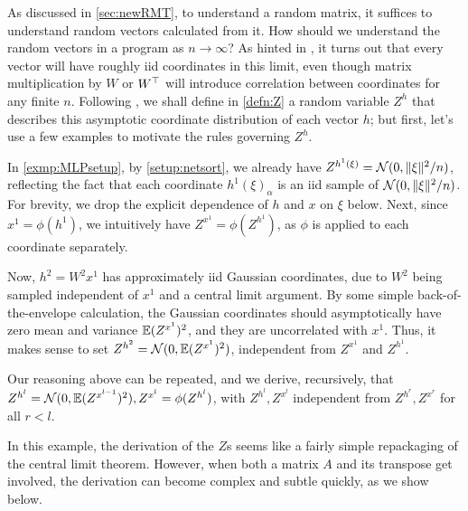 \documentclass[main.tex]{subfiles}
\begin{document}
As discussed in \cref{sec:newRMT}, to understand a random matrix, it suffices to understand random vectors calculated from it.
How should we understand the random vectors in a \netsort{} program as $n\to\infty$? As hinted in \citet{yangTP1,yangTP2}, it turns out that every vector will have roughly iid coordinates in this limit, even though matrix multiplication by $W$ or $W^{\top}$ will introduce correlation between coordinates for any finite $n$.
Following \citet{yangTP2}, we shall define in \cref{defn:Z} a random variable $Z^h$ that describes this asymptotic coordinate distribution of each vector $h$; but first, let's use a few examples to motivate the rules governing $Z^h$.

\begin{exmp}\label{exmp:MLPZs}
In \cref{exmp:MLPsetup}, by \cref{setup:netsort}, we already have $Z^{h^1(\xi)} = \mathcal{N}(0, \|\xi\|^2/n)$, reflecting the fact that each coordinate $h^1(\xi)_\alpha$ is an iid sample of $\mathcal{N}(0, \|\xi\|^2/n)$.
For brevity, we drop the explicit dependence of $h$ and $x$ on $\xi$ below.
Next, since ${x^1} = {\phi(h^1)}$, we intuitively have $Z^{x^1} = \phi(Z^{h^1})$, as $\phi$ is applied to each coordinate separately.

Now, ${h^2} = W^2 x^1$ has approximately iid Gaussian coordinates, due to $W^2$ being sampled independent of $x^1$ and a central limit argument.
By some simple back-of-the-envelope calculation, the Gaussian coordinates should asymptotically have zero mean and variance $\operatorname*{\mathbb{E}}(Z^{x^1})^2$, and they are uncorrelated with $x^1$.
Thus, it makes sense to set $Z^{h^2} = \mathcal{N}(0, \operatorname*{\mathbb{E}}(Z^{x^1})^2)$, independent from $Z^{x^1}$ and $Z^{h^1}$.

Our reasoning above can be repeated, and we derive, recursively, that $Z^{h^l} =  \mathcal{N}(0, \operatorname*{\mathbb{E}} (Z^{x^{l-1}})^2), Z^{x^l} = \phi(Z^{h^l})$, with $Z^{h^l}, Z^{x^l}$ independent from $Z^{h^r}, Z^{x^r}$ for all $r < l$.
\end{exmp}

In this example, the derivation of the $Z$s seems like a fairly simple repackaging of the central limit theorem.
However, when both a matrix $A$ and its transpose get involved, the derivation can become complex and subtle quickly, as we show below.
\end{document}
